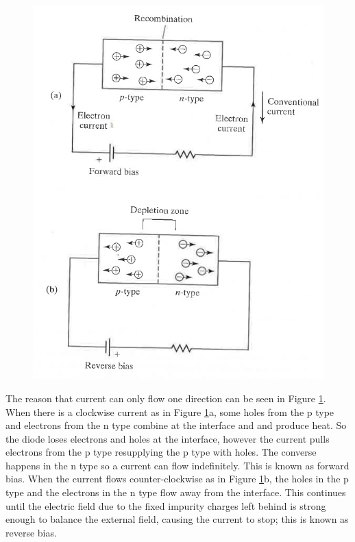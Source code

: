 \documentclass[ aip, 12pt]{revtex4-1} %
\begin{document}
\begin{figure}[H]
\centerline{\includegraphics[scale=.7]{pnJunction.png}}
\caption{ }
\label{pnJunction}
\end{figure}

The reason that current can only flow one direction can be seen in Figure \ref{pnJunction}. When there is a clockwise current as in Figure \ref{pnJunction}a, some holes from the p type and electrons from the n type combine at the interface and and produce heat.  So the diode loses electrons and holes at the interface, however the current pulls electrons from the p type resupplying the p type with holes. The converse happens in the n type so a current can flow indefinitely. This is known as forward bias. When the current flows counter-clockwise as in Figure \ref{pnJunction}b, the holes in the p type and the electrons in the n type flow away from the interface. This continues until the electric field due to the fixed impurity charges left behind is strong enough to balance the external field, causing the current to stop; this is known as reverse bias. 
\end{document}
